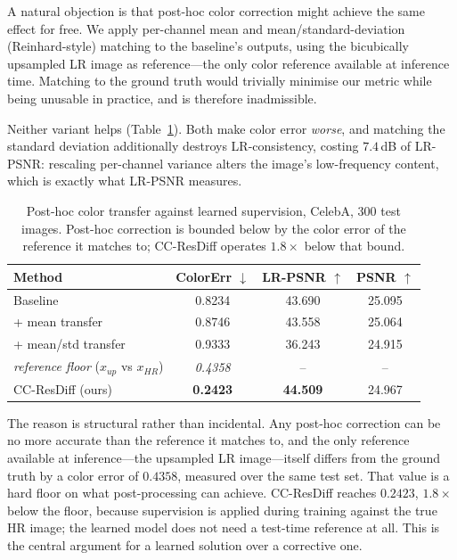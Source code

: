 \documentclass[11pt]{article}
\newcommand{\best}[1]{\textbf{#1}}
\begin{document}
A natural objection is that post-hoc color correction might achieve the same
effect for free. We apply per-channel mean and mean/standard-deviation
(Reinhard-style) matching to the baseline's outputs, using the bicubically
upsampled LR image as reference---the only color reference available at inference
time. Matching to the ground truth would trivially minimise our metric while
being unusable in practice, and is therefore inadmissible.

Neither variant helps (Table~\ref{tab:ct}). Both make color error \emph{worse},
and matching the standard deviation additionally destroys LR-consistency,
costing $7.4$\,dB of LR-PSNR: rescaling per-channel variance alters the image's
low-frequency content, which is exactly what LR-PSNR measures.

\begin{table}[t]
\centering
\small
\begin{tabular}{lccc}
\toprule
Method & ColorErr $\downarrow$ & LR-PSNR $\uparrow$ & PSNR $\uparrow$ \\
\midrule
Baseline                & 0.8234 & 43.690 & 25.095 \\
\; + mean transfer      & 0.8746 & 43.558 & 25.064 \\
\; + mean/std transfer  & 0.9333 & 36.243 & 24.915 \\
\midrule
\emph{reference floor} ($x_{up}$ vs $x_{HR}$) & \emph{0.4358} & -- & -- \\
\midrule
CC-ResDiff (ours)       & \best{0.2423} & \best{44.509} & 24.967 \\
\bottomrule
\end{tabular}
\caption{Post-hoc color transfer against learned supervision, CelebA, 300 test
images. Post-hoc correction is bounded below by the color error of the reference
it matches to; CC-ResDiff operates $1.8\times$ below that bound.}
\label{tab:ct}
\end{table}

The reason is structural rather than incidental. Any post-hoc correction can be
no more accurate than the reference it matches to, and the only reference
available at inference---the upsampled LR image---itself differs from the ground
truth by a color error of $0.4358$, measured over the same test set. That value
is a hard floor on what post-processing can achieve. CC-ResDiff reaches $0.2423$,
$1.8\times$ below the floor, because supervision is applied during training
against the true HR image; the learned model does not need a test-time reference
at all. This is the central argument for a learned solution over a corrective
one.
\end{document}
